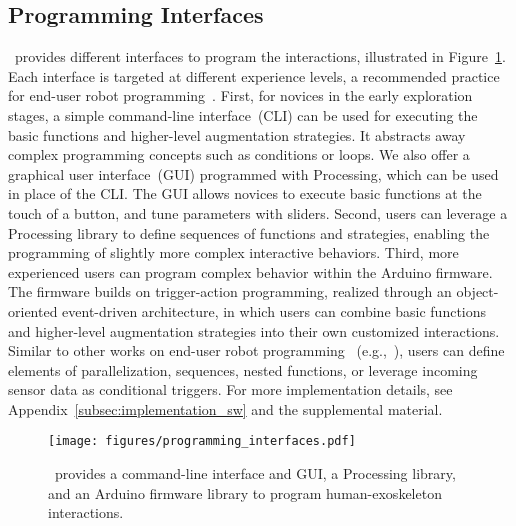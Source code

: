 \subsection{Programming Interfaces}\label{subsec:interfaces}

\toolkit~provides different interfaces to program the interactions, illustrated in Figure~\ref{fig:programmability}. Each interface is targeted at different experience levels, a recommended practice for end-user robot programming~\cite{ajaykumar_2021}. 
First, for novices in the early exploration stages, a simple command-line interface~(CLI) can be used for executing the basic functions and higher-level augmentation strategies. It abstracts away complex programming concepts such as conditions or loops. We also offer a graphical user interface~(GUI) programmed with Processing, which can be used in place of the CLI. The GUI allows novices to execute basic functions at the touch of a button, and tune parameters with sliders. Second, users can leverage a Processing library to define sequences of functions and strategies, enabling the programming of slightly more complex interactive behaviors.
Third, more experienced users can program complex behavior within the Arduino firmware. The firmware builds on trigger-action programming, realized through an object-oriented event-driven architecture, in which users can combine basic functions and higher-level augmentation strategies into their own customized interactions. Similar to other works on end-user robot programming ~(e.g.,~\cite{guerin_2015, angerer_2013, ur_2014}), users can define elements of parallelization, sequences, nested functions, or leverage incoming sensor data as conditional triggers. For more implementation details, see Appendix~\ref{subsec:implementation_sw} and the supplemental material. 

\begin{figure}[bt]
    \centering
    \texttt{[image: figures/programming\_interfaces.pdf]}
    \caption{\toolkit~provides a command-line interface and GUI, a Processing library, and an Arduino firmware library to program human-exoskeleton interactions.}
    \label{fig:programmability}
\end{figure}